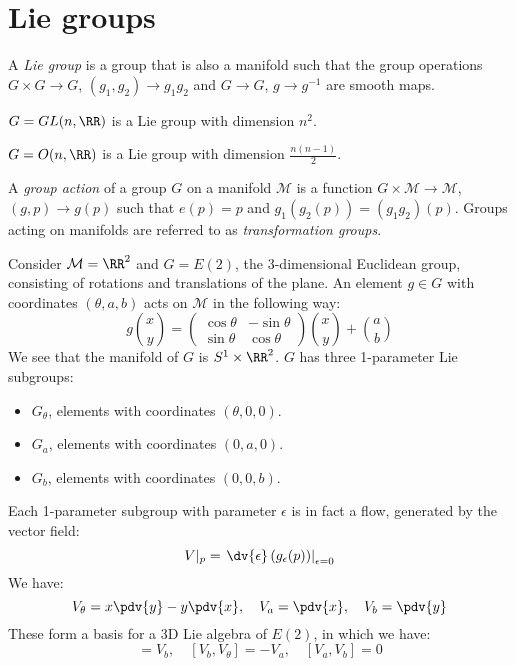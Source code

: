\documentclass{jknotes}
\begin{document}
\section{Lie groups}
\begin{defn}
    A \emph{Lie group} is a group that is also a manifold such that the group operations \(G\times G\to G\), \((g_1,g_2)\to g_1g_2\) and \(G\to G\), \(g\to g^{-1}\) are smooth maps.
\end{defn}
\begin{eg}
    \(G=GL(n,\RR)\) is a Lie group with dimension \(n^2\).
\end{eg}
\begin{eg}
    \(G=O(n,\RR)\) is a Lie group with dimension \(\frac{n(n-1)}{2}\).
\end{eg}
\begin{defn}
    A \emph{group action} of a group \(G\) on a manifold \(\mathcal{M}\) is a function \(G\times\mathcal{M}\to\mathcal{M}\), \((g,p)\to g(p)\) such that \(e(p) = p\) and \(g_1(g_2(p)) = (g_1g_2)(p)\). Groups acting on manifolds are referred to as \emph{transformation groups}.
\end{defn}
\begin{eg}
    Consider \(\mathcal{M}=\RR^2\) and \(G=E(2)\), the 3-dimensional Euclidean group, consisting of rotations and translations of the plane. An element \(g \in G\) with coordinates \((\theta,a,b)\) acts on \(\mathcal{M}\) in the following way:
    \begin{equation}
        g{x\choose y} = 
        \begin{pmatrix}
            \cos\theta & -\sin\theta \\
            \sin\theta & \cos\theta
        \end{pmatrix}
        {x\choose y}
        + {a\choose b}
    \end{equation}
    We see that the manifold of \(G\) is \(S^1\times \RR^2\). \(G\) has three 1-parameter Lie subgroups:
    \begin{itemize}
        \item \(G_\theta\), elements with coordinates \((\theta,0,0)\). 
        \item \(G_a\), elements with coordinates \((0,a,0)\). 
        \item \(G_b\), elements with coordinates \((0,0,b)\). 
    \end{itemize}
    Each 1-parameter subgroup with parameter \(\epsilon\) is in fact a flow, generated by the vector field:
    \begin{equation}
        V|_p = \left.\dv{\epsilon}\left( g_\epsilon(p) \right)\right|_{\epsilon=0}
    \end{equation}
    We have:
    \begin{equation}
        V_\theta = x\pdv{y}-y\pdv{x},\quad
        V_a = \pdv{x},\quad
        V_b = \pdv{y}
    \end{equation}
    These form a basis for a 3D Lie algebra of \(E(2)\), in which we have:
    \begin{equation}
        [V_a,V_\theta] = V_b,\quad
        [V_b,V_\theta] = -V_a,\quad
        [V_a,V_b] = 0
    \end{equation}
\end{eg}
\end{document}
